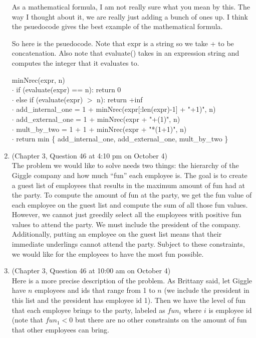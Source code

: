 \documentclass{article}
\begin{document}
\begin{enumerate}
        As a mathematical formula, I am not really sure what you mean by this.
        The way I thought about it, we are really just adding a bunch of ones up.
        I think the psuedocode gives the best example of the mathematical formula.

        So here is the psuedocode.
        Note that expr is a string so we take + to be concatenation.
        Also note that evaluate() takes in an expression string and computes the integer that it evaluates to.

        \begin{algorithm}
            minNrec(expr, n) \\
            $\cdot$ \hspace{1.5em} if (evaluate(expr) == n): return 0 \\
            $\cdot$ \hspace{1.5em} else if (evaluate(expr) $>$ n): return +inf \\
            $\cdot$ \hspace{1.5em} add\_internal\_one = 1 + minNrec(expr[:len(expr)-1] + "+1)", n) \\
            $\cdot$ \hspace{1.5em} add\_external\_one = 1 + minNrec(expr + "+(1)", n) \\
            $\cdot$ \hspace{1.5em} mult\_by\_two = 1 + 1 + minNrec(expr + "*(1+1)", n) \\
            $\cdot$ \hspace{1.5em} return min \{ add\_internal\_one, add\_external\_one, mult\_by\_two \}
        \end{algorithm}
    \item (Chapter 3, Question 46 at 4:10 pm on October 4) \\
        The problem we would like to solve needs two things: the hierarchy of the Giggle company and how much ``fun'' each employee is.
        The goal is to create a guest list of employees that results in the maximum amount of fun had at the party.
        To compute the amount of fun at the party, we get the fun value of each employee on the guest list and compute the sum of all those fun values.
        However, we cannot just greedily select all the employees with positive fun values to attend the party.
        We must include the president of the company.
        Additionally, putting an employee on the guest list means that their immediate underlings cannot attend the party.
        Subject to these constraints, we would like for the employees to have the most fun possible.
    \item (Chapter 3, Question 46 at 10:00 am on October 4) \\
        Here is a more precise description of the problem. As Brittany said, let Giggle have $n$ employees and ids that range from 1 to $n$ (we include the president in this list and the president has employee id 1). Then we have the level of fun that each employee brings to the party, labeled as $fun_i$ where $i$ is employee id (note that $fun_1 < 0$ but there are no other constraints on the amount of fun that other employees can bring.


\end{enumerate}
\end{document}

